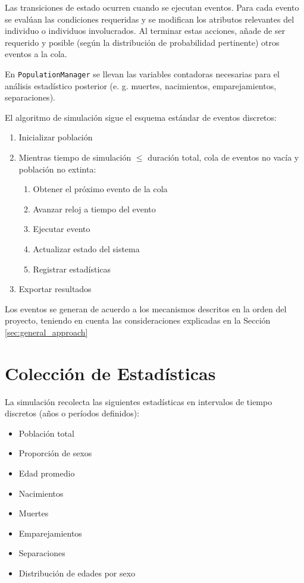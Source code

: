 \documentclass[12pt, a4paper, spanish]{report}
\begin{document}
Las transiciones de estado ocurren cuando se ejecutan eventos. Para cada evento se evalúan las condiciones requeridas y se modifican los atributos relevantes del individuo o individuos involucrados. Al terminar estas acciones, añade de ser requerido y posible (según la distribución de probabilidad pertinente) otros eventos a la cola.

En \texttt{PopulationManager} se llevan las variables contadoras necesarias para el análisis estadístico posterior (e. g. muertes, nacimientos, emparejamientos, separaciones).

El algoritmo de simulación sigue el esquema estándar de eventos discretos:

\begin{enumerate}
    \item Inicializar población
    \item Mientras tiempo de simulación $\leq$ duración total, cola de eventos no vacía y población no extinta:
    \begin{enumerate}
        \item Obtener el próximo evento de la cola
        \item Avanzar reloj a tiempo del evento
        \item Ejecutar evento
        \item Actualizar estado del sistema
        \item Registrar estadísticas
    \end{enumerate}
    \item Exportar resultados
\end{enumerate}

Los eventos se generan de acuerdo a los mecanismos descritos en la orden del proyecto, teniendo en cuenta las consideraciones explicadas en la Sección \ref{sec:general_approach}

\section{Colección de Estadísticas}

La simulación recolecta las siguientes estadísticas en intervalos de tiempo discretos (años o períodos definidos):

\begin{itemize}
    \item Población total
    \item Proporción de sexos
    \item Edad promedio
    \item Nacimientos
    \item Muertes
    \item Emparejamientos
    \item Separaciones
    \item Distribución de edades por sexo
\end{itemize}
\end{document}
